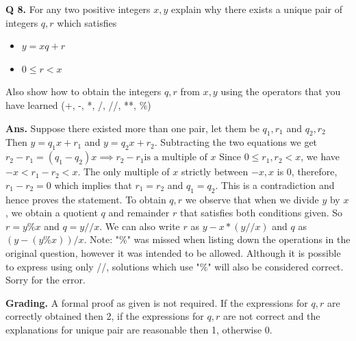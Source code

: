 \documentclass{article}
\begin{document}
\clearpage

\begin{flushleft}

\textbf{Q 8. } For any two positive integers $x, y$ explain why there exists a unique pair of 
integers $q, r$ which satisfies 

\begin{itemize}
    \item $y = x q + r$
    \item $0 \leq r < x$
\end{itemize}

Also show how to obtain the integers $q, r$ from $x, y$ using the operators that you have learned
(+, -, *, /, //, **, \%)
    
\end{flushleft}

\begin{flushleft}

\textbf{Ans. } Suppose there existed more than one pair, let them be $q_1, r_1$ and $q_2, r_2$
\linebreak
Then $y = q_1 x + r_1$ and $y = q_2 x + r_2$.
\linebreak
Subtracting the two equations we get $r_2 - r_1 = (q_1 - q_2) x \implies r_2 - r_1 \text{is a multiple of }x$
\linebreak
Since $0 \leq r_1, r_2 < x$, we have $-x < r_1 - r_2 < x$.
The only multiple of $x$ strictly between $-x, x$ is $0$, therefore, $r_1 - r_2 = 0$ which implies 
that $r_1 = r_2$ and $q_1 = q_2$. This is a contradiction and hence proves the statement.
\linebreak
To obtain $q, r$ we observe that when we divide $y$ by $x$, we obtain a quotient $q$ and remainder $r$ that 
satisfies both conditions given. So $r = y \% x$ and $q = y // x$.
\linebreak
We can also write $r$ as $y - x * (y // x)$ and $q$ as $(y - (y \% x)) / x$.
\linebreak
Note: "$\%$" was missed when listing down the operations in the original question, however it was intended to be allowed. 
Although it is possible to express using only //, solutions which use "$\%$" will also be considered
correct.
Sorry for the error.
    
\end{flushleft}

\begin{flushleft}

\textbf{Grading. } A formal proof as given is not required. If the expressions for $q, r$ are correctly 
obtained then 2, if the expressions for $q, r$ are not correct and the explanations for unique pair are 
reasonable then 1, otherwise 0.
        
\end{flushleft}
\end{document}
